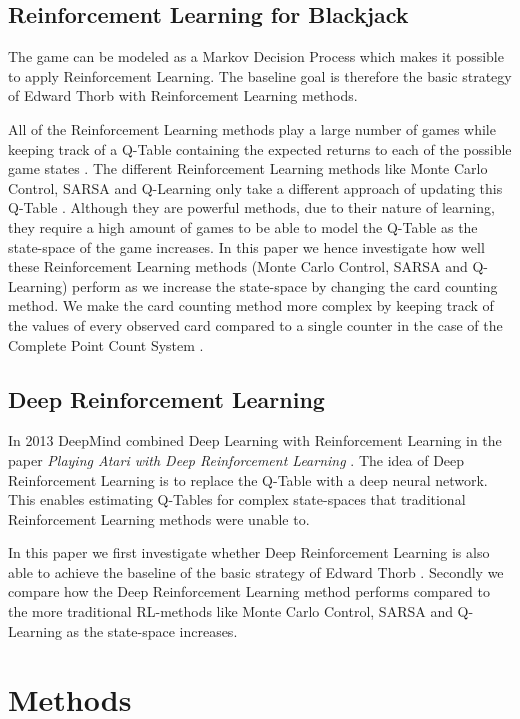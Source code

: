 \documentclass[conference]{IEEEtran}
\begin{document}
\subsection{Reinforcement Learning for Blackjack}
The game can be modeled as a Markov Decision Process which makes it possible to apply Reinforcement Learning.
The baseline goal is therefore the basic strategy of Edward Thorb \cite{b1} with Reinforcement Learning methods.

All of the Reinforcement Learning methods play a large number of games while keeping track of a Q-Table containing the expected returns to each of the possible game states \cite{b4}.
The different Reinforcement Learning methods like Monte Carlo Control, SARSA and Q-Learning only take a different approach of updating this Q-Table \cite{b4}.
Although they are powerful methods, due to their nature of learning, they require a high amount of games to be able to model the Q-Table as the state-space of the game increases. 
In this paper we hence investigate how well these Reinforcement Learning methods (Monte Carlo Control, SARSA and Q-Learning) perform as we increase the state-space by changing the card counting method. 
We make the card counting method more complex by keeping track of the values of every observed card compared to a single counter in the case of the Complete Point Count System \cite{b1}.

\subsection{Deep Reinforcement Learning}
In 2013 DeepMind combined Deep Learning with Reinforcement Learning in the paper \textit{Playing Atari with Deep Reinforcement Learning} \cite{b2}.
The idea of Deep Reinforcement Learning is to replace the Q-Table with a deep neural network.
This enables estimating Q-Tables for complex state-spaces that traditional Reinforcement Learning methods were unable to.

In this paper we first investigate whether Deep Reinforcement Learning is also able to achieve the baseline of the basic strategy of Edward Thorb \cite{b1}.
Secondly we compare how the Deep Reinforcement Learning method performs compared to the more traditional RL-methods like Monte Carlo Control, SARSA and Q-Learning \cite{b4} as the state-space increases.



\section{Methods}
\end{document}
